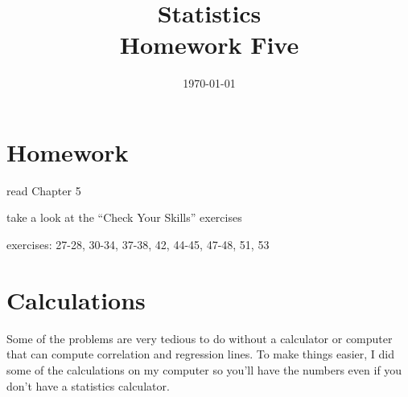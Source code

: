 \documentclass[letterpaper, landscape]{exam}
\title{Statistics \\ Homework Five}
\date{\today}
\author{}
\begin{document}
  \maketitle

  \section{Homework}
    \begin{itemize*}
      \item read Chapter 5 
      \item take a look at the ``Check Your Skills'' exercises
      \item exercises: 27-28, 30-34, 37-38, 42, 44-45, 47-48, 51, 53
    \end{itemize*}

  \ifprintanswers
  \else
    \section{Calculations}

    Some of the problems are very tedious to do without a calculator or
    computer that can compute correlation and regression lines.  To make things
    easier, I did some of the calculations on my computer so you'll have the
    numbers even if you don't have a statistics calculator.
\end{document}
